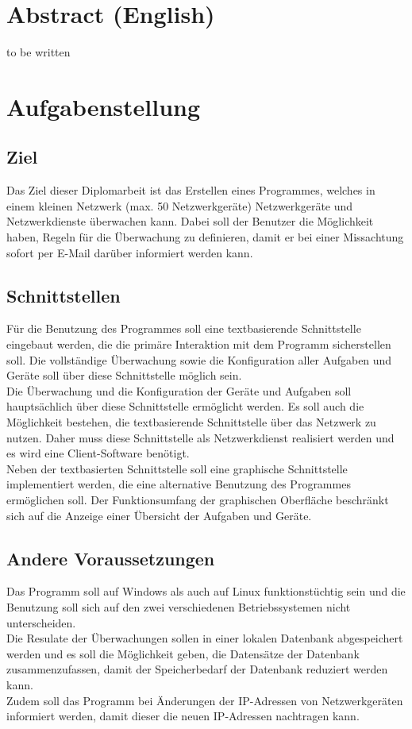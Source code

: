 \documentclass[12pt,a4paper]{report}
\begin{document}
\begin{onehalfspace}
\chapter{Abstract (English)}
to be written

\chapter{Aufgabenstellung}

\section{Ziel}

Das Ziel dieser Diplomarbeit ist das Erstellen eines Programmes, welches in einem kleinen Netzwerk (max. 50 Netzwerkgeräte) Netzwerkgeräte und Netzwerkdienste überwachen kann. Dabei soll der Benutzer die Möglichkeit haben, Regeln für die Überwachung zu definieren, damit er bei einer Missachtung sofort per E-Mail darüber informiert werden kann.


\section{Schnittstellen}

Für die Benutzung des Programmes soll eine textbasierende Schnittstelle eingebaut werden, die die primäre Interaktion mit dem Programm sicherstellen soll. Die vollständige Überwachung sowie die Konfiguration aller Aufgaben und Geräte soll über diese Schnittstelle möglich sein.\\
Die Überwachung und die Konfiguration der Geräte und Aufgaben soll hauptsächlich über diese Schnittstelle ermöglicht werden.
Es soll auch die Möglichkeit bestehen, die textbasierende Schnittstelle über das Netzwerk zu nutzen. Daher muss diese Schnittstelle als Netzwerkdienst realisiert werden und es wird eine Client-Software benötigt.\\
Neben der textbasierten Schnittstelle soll eine graphische Schnittstelle implementiert werden, die eine alternative Benutzung des Programmes ermöglichen soll. Der Funktionsumfang der graphischen Oberfläche beschränkt sich auf die Anzeige einer Übersicht der Aufgaben und Geräte.

\section{Andere Voraussetzungen}

Das Programm soll auf Windows als auch auf Linux funktionstüchtig sein und die Benutzung soll sich auf den zwei verschiedenen Betriebssystemen nicht unterscheiden.\\
Die Resulate der Überwachungen sollen in einer lokalen Datenbank abgespeichert werden und es soll die Möglichkeit geben, die Datensätze der Datenbank zusammenzufassen, damit der Speicherbedarf der Datenbank reduziert werden kann.\\
Zudem soll das Programm bei Änderungen der IP-Adressen von Netzwerkgeräten informiert werden, damit dieser die neuen IP-Adressen nachtragen kann.


\end{onehalfspace}
\end{document}
